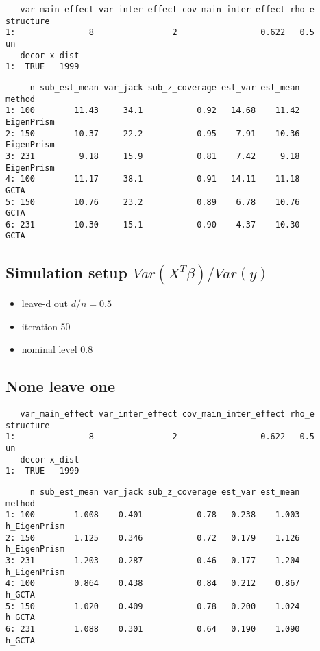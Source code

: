 \documentclass[]{article}
\providecommand{\tightlist}{%
  \setlength{\itemsep}{0pt}\setlength{\parskip}{0pt}}
\begin{document}
\begin{verbatim}
   var_main_effect var_inter_effect cov_main_inter_effect rho_e structure
1:               8                2                 0.622   0.5        un
   decor x_dist
1:  TRUE   1999
\end{verbatim}

\begin{verbatim}
     n sub_est_mean var_jack sub_z_coverage est_var est_mean     method
1: 100        11.43     34.1           0.92   14.68    11.42 EigenPrism
2: 150        10.37     22.2           0.95    7.91    10.36 EigenPrism
3: 231         9.18     15.9           0.81    7.42     9.18 EigenPrism
4: 100        11.17     38.1           0.91   14.11    11.18       GCTA
5: 150        10.76     23.2           0.89    6.78    10.76       GCTA
6: 231        10.30     15.1           0.90    4.37    10.30       GCTA
\end{verbatim}

\subsection{\texorpdfstring{Simulation setup
\(Var(X^T\beta)/Var(y)\)}{Simulation setup Var(X\^{}T\textbackslash{}beta)/Var(y)}}\label{simulation-setup-varxtbetavary}

\begin{itemize}
\tightlist
\item
  leave-d out \(d/n = 0.5\)
\item
  iteration 50
\item
  nominal level 0.8
\end{itemize}

\subsection{None leave one}\label{none-leave-one}

\begin{verbatim}
   var_main_effect var_inter_effect cov_main_inter_effect rho_e structure
1:               8                2                 0.622   0.5        un
   decor x_dist
1:  TRUE   1999
\end{verbatim}

\begin{verbatim}
     n sub_est_mean var_jack sub_z_coverage est_var est_mean       method
1: 100        1.008    0.401           0.78   0.238    1.003 h_EigenPrism
2: 150        1.125    0.346           0.72   0.179    1.126 h_EigenPrism
3: 231        1.203    0.287           0.46   0.177    1.204 h_EigenPrism
4: 100        0.864    0.438           0.84   0.212    0.867       h_GCTA
5: 150        1.020    0.409           0.78   0.200    1.024       h_GCTA
6: 231        1.088    0.301           0.64   0.190    1.090       h_GCTA
\end{verbatim}
\end{document}
